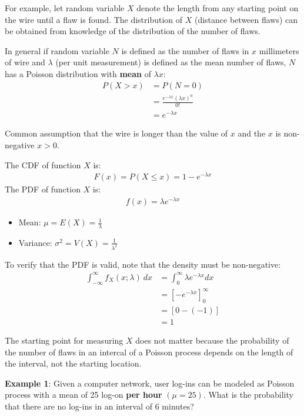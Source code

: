 \documentclass[10pt,a4paper]{article}
\begin{document}
For example, let random variable $X$ denote the length from any starting point on the wire until a flaw is found.
The distribution of $X$ (distance between flaws) can be obtained from knowledge of the distribution
of the number of flaws. 

In general if random variable $N$ is defined as the number of flaws in $x$ millimeters of wire and
$\lambda$ (per unit measurement) is defined as the mean number of flaws, $N$ has a Poisson distribution
with \textbf{mean} of $\lambda x$:
\begin{align*}
    P(X>x) &= P(N=0) \\
    &= \frac{e^{-\lambda x}(\lambda x)^0}{0!} \\
    &= e^{-\lambda x}
\end{align*}

Common assumption that the wire is longer than the value of $x$ and the $x$ is non-negative $x > 0$.

The CDF of function $X$ is:
\begin{align*}
    F(x) = P(X\leq x) = 1 - e^{-\lambda x} 
\end{align*}
The PDF of function $X$ is:
\begin{align*}
    f(x) = \lambda e^{-\lambda x}
\end{align*}
\begin{itemize}
    \item Mean: $\mu = E(X) = \frac{1}{\lambda}$ 
    \item Variance: $\sigma^2 = V(X) = \frac{1}{\lambda^2}$
\end{itemize}

To verify that the PDF is valid, note that the density must be non-negative:
\begin{align*}
    \int_{-\infty}^{\infty} f_X (x;\lambda)\: dx &= \int_0^{\infty} \lambda e^{-\lambda x} dx \\
    &= \left[-e^{-\lambda x}\right]_0^\infty \\
    &= [0-(-1)] \\
    &= 1
\end{align*}

The starting point for measuring $X$ does not matter because the probability of the number
of flaws in an intercal of a Poisson process depends on the length of the interval, not the starting
location.

\textbf{Example 1}: Given a computer network, user log-ins can be modeled as Poisson process with a
mean of 25 log-on \textbf{per hour} $(\mu = 25)$. What is the probability that there are no log-ins
in an interval of 6 minutes?
\end{document}
